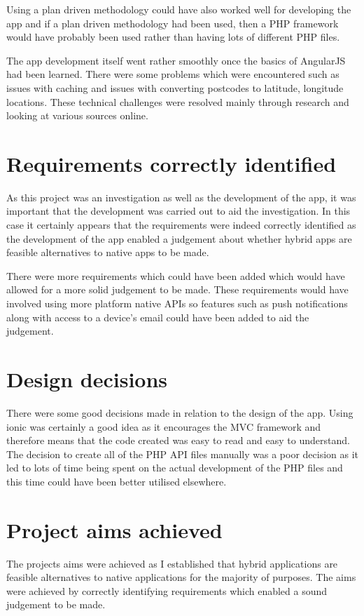 Using a plan driven methodology could have also worked well for developing the app and if a plan driven methodology had been used, then a PHP framework would have probably been used rather than having lots of different PHP files. 

The app development itself went rather smoothly once the basics of AngularJS had been learned. There were some problems which were encountered such as issues with caching and issues with converting postcodes to latitude, longitude locations. These technical challenges were resolved mainly through research and looking at various sources online.      
\section{Requirements correctly identified}
As this project was an investigation as well as the development of the app, it was important that the development was carried out to aid the investigation. In this case it certainly appears that the requirements were indeed correctly identified as the development of the app enabled a judgement about whether hybrid apps are feasible alternatives to native apps to be made.

There were more requirements which could have been added which would have allowed for a more solid judgement to be made. These requirements would have involved using more platform native APIs so features such as push notifications along with access to a device's email could have been added to aid the judgement.
\section{Design decisions}
There were some good decisions made in relation to the design of the app. Using ionic was certainly a good idea as it encourages the MVC framework and therefore means that the code created was easy to read and easy to understand. The decision to create all of the PHP API files manually was a poor decision  as it led to lots of time being spent on the actual development of the PHP files and this time could have been better utilised elsewhere.
\section{Project aims achieved}
The projects aims were achieved as I established that hybrid applications are feasible alternatives to native applications for the majority of purposes. The aims were achieved by correctly identifying requirements which enabled a sound judgement to be made.
